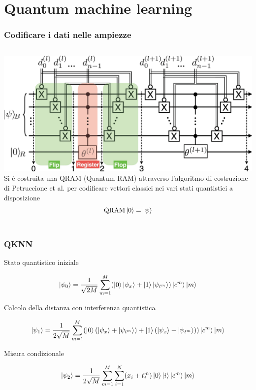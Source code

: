 \documentclass{beamer}
\begin{document}
	\section{Quantum machine learning}

	\begin{frame}
		\frametitle{Codificare i dati nelle ampiezze}
		
		\begin{columns}
				\includegraphics[width=\textwidth]{gfx/qram.png}
				Si è costruita una QRAM (Quantum RAM) attraverso 
				l'algoritmo di costruzione di Petruccione et al. per 
				codificare vettori classici nei vari stati quantistici 
				a disposizione
				\begin{equation*}
					\text{QRAM} \ket{0} = \ket{\psi}
				\end{equation*}
		\end{columns}
		
	\end{frame}

	\begin{frame}
		\frametitle{QKNN}
	
		Stato quantistico iniziale

		\begin{equation*}
			\ket{\psi_0} = \frac{1}{\sqrt{2M}} \sum_{m=1}^M 
			(\ket{0}\ket{\psi_x}+\ket{1}\ket{\psi_{t^m}})\ket{c^m}\ket{m}
		\end{equation*}

		Calcolo della distanza con interferenza quantistica

		\begin{equation*}
			\ket{\psi_1} = \frac{1}{2\sqrt{M}}\sum_{m=1}^M 
			(\ket{0}(\ket{\psi_x}+\ket{\psi_{t^m}})+\ket{1}(\ket{\psi_x}-\ket{\psi_{t^m}}))\ket{c^m}\ket{m}
		\end{equation*}
	
		Misura condizionale

		\begin{equation*}
			\ket{\psi_2} = \frac{1}{2\sqrt{M}} \sum_{m=1}^M \sum_{i=1}^N
			(x_i+t_i^m)\ket{0}\ket{i}\ket{c^m}\ket{m}
		\end{equation*}

		

	\end{frame}
\end{document}
